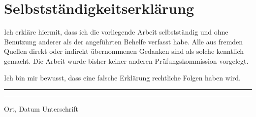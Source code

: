 \clearpage
\section*{Selbstständigkeitserklärung}

\vspace{8mm}
Ich erkläre hiermit, dass ich die vorliegende Arbeit selbstständig und ohne Benutzung anderer als der angeführten Behelfe verfasst habe. Alle aus fremden Quellen direkt oder indirekt übernommenen Gedanken sind als solche kenntlich gemacht. Die Arbeit wurde bisher keiner anderen Prüfungskommission vorgelegt. 

Ich bin mir bewusst, dass eine falsche Erklärung rechtliche Folgen haben wird.

\vspace{12mm}

\rule{4cm}{0.4pt}\hfill\rule{6cm}{0.4pt}

Ort, Datum \hfill Unterschrift